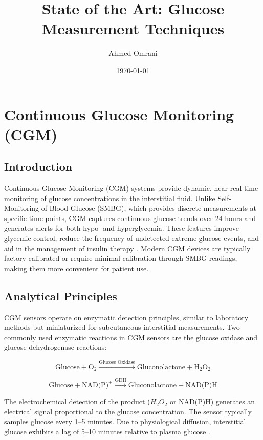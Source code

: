 \documentclass[12pt,a4paper]{article}  %
\title{State of the Art: Glucose Measurement Techniques}
\author{Ahmed Omrani}
\date{\today}
\begin{document}
\maketitle

\tableofcontents
\newpage

\section{Continuous Glucose Monitoring (CGM)}

\subsection{Introduction}
Continuous Glucose Monitoring (CGM) systems provide dynamic, near real-time monitoring of glucose concentrations in the interstitial fluid. Unlike Self-Monitoring of Blood Glucose (SMBG), which provides discrete measurements at specific time points, CGM captures continuous glucose trends over 24 hours and generates alerts for both hypo- and hyperglycemia. These features improve glycemic control, reduce the frequency of undetected extreme glucose events, and aid in the management of insulin therapy \cite{CGM_Ambulatory_Review_2024, CGM_Routine_Care_2024}. Modern CGM devices are typically factory-calibrated or require minimal calibration through SMBG readings, making them more convenient for patient use.

\subsection{Analytical Principles}
CGM sensors operate on enzymatic detection principles, similar to laboratory methods but miniaturized for subcutaneous interstitial measurements. Two commonly used enzymatic reactions in CGM sensors are the glucose oxidase and glucose dehydrogenase reactions:

\[
\text{Glucose} + \text{O}_2 \xrightarrow{\text{Glucose Oxidase}} \text{Gluconolactone} + \text{H}_2\text{O}_2
\]

\[
\text{Glucose} + \text{NAD(P)}^+ \xrightarrow{\text{GDH}} \text{Gluconolactone} + \text{NAD(P)H}
\]

The electrochemical detection of the product (\(H_2O_2\) or NAD(P)H) generates an electrical signal proportional to the glucose concentration. The sensor typically samples glucose every 1--5 minutes. Due to physiological diffusion, interstitial glucose exhibits a lag of 5--10 minutes relative to plasma glucose \cite{CGM_ICU_Accuracy_2024}.
\end{document}
